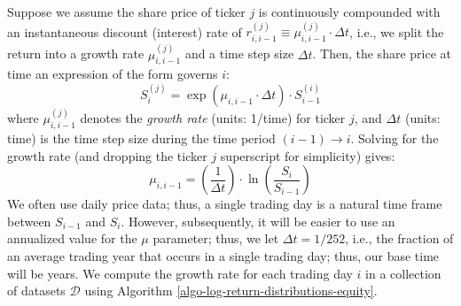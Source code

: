 \documentclass[11pt]{article}
\theoremstyle{definition}
\begin{document}
Suppose we assume the share price of ticker $j$ is continuously compounded with an instantaneous discount (interest) rate of 
$r^{(j)}_{i,i-1}\equiv\mu^{(j)}_{i,i-1}\cdot\Delta{t}$, i.e., we split the return into a growth rate $\mu^{(j)}_{i,i-1}$ and a time step size $\Delta{t}$.
Then, the share price at time an expression of the form governs $i$:
\begin{equation}\label{eqn:share-price-growth-rate}
S^{(j)}_{i} = \exp\left(\mu_{i,i-1}\cdot\Delta{t}\right)\cdot{S^{(i)}_{i-1}}
\end{equation}
where $\mu^{(j)}_{i,i-1}$ denotes the \textit{growth rate} (units: 1/time) for ticker $j$, and $\Delta{t}$ (units: time) 
is the time step size during the time period $(i-1)\rightarrow{i}$.
Solving for the growth rate (and dropping the ticker $j$ superscript for simplicity) gives:
\begin{equation}
\mu_{i,i-1} = \left(\frac{1}{\Delta{t}}\right)\cdot\ln\left(\frac{S_{i}}{S_{i-1}}\right)
\end{equation}
We often use daily price data; thus, a single trading day is a natural time frame between $S_{i-1}$ and $S_{i}$. 
However, subsequently, it will be easier to use an annualized value for the $\mu$ parameter; thus, we let $\Delta{t} = 1/252$, 
i.e., the fraction of an average trading year that occurs in a single trading day; thus, our base time will be years.
We compute the growth rate for each trading day $i$ in a collection of datasets $\mathcal{D}$ using Algorithm \ref{algo-log-return-distributions-equity}.
\end{document}

